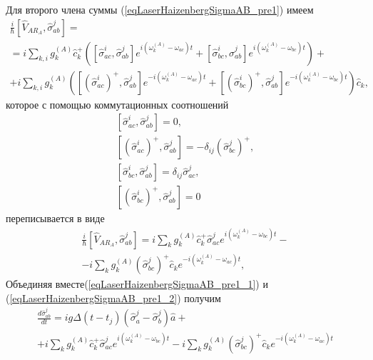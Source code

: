 Для второго члена суммы (\ref{eqLaserHaizenbergSigmaAB_pre1}) имеем
\begin{eqnarray}
\frac{i}{\hbar}
\left[\hat{V}_{AR_A}, \hat{\sigma}_{ab}^j\right] = 
\nonumber \\
=
i
\sum_{k,i}
g_k^{(A)}
\hat{c}_k^{+}
 \left(
\left[\hat{\sigma}^{i}_{ac},\hat{\sigma}_{ab}^j\right]  
e^{i\left(\omega_k^{(A)} - \omega_{ac}\right)t}
+ 
\left[\hat{\sigma}^{i}_{bc},\hat{\sigma}_{ab}^j\right]  
e^{i\left(\omega_k^{(A)} - \omega_{bc}\right)t}
\right)
+
\nonumber \\
+
 i
\sum_{k,i}
g_k^{(A)}
 \left(
\left[\left(\hat{\sigma}^{i}_{ac}\right)^{+},\hat{\sigma}_{ab}^j\right]  
e^{-i\left(\omega_k^{(A)} - \omega_{ac}\right)t}
+ 
\left[\left(\hat{\sigma}^{i}_{bc}\right)^{+},\hat{\sigma}_{ab}^j\right]  
e^{-i\left(\omega_k^{(A)} - \omega_{bc}\right)t}
\right)\hat{c}_k,
\nonumber
\end{eqnarray}
которое с помощью коммутационных соотношений
\begin{eqnarray}
\left[\hat{\sigma}^{i}_{ac},\hat{\sigma}_{ab}^j\right] = 0, 
\nonumber \\
\left[\left(\hat{\sigma}^{i}_{ac}\right)^{+},\hat{\sigma}_{ab}^j\right] = 
- \delta_{ij}\left(\hat{\sigma}^{j}_{bc}\right)^{+},
\nonumber \\
\left[\hat{\sigma}^{i}_{bc},\hat{\sigma}_{ab}^j\right] = \delta_{ij}\hat{\sigma}^{j}_{ac},
\nonumber \\
\left[\left(\hat{\sigma}^{i}_{bc}\right)^{+},\hat{\sigma}_{ab}^j\right] = 0
\label{eqLaserHaizenbergTaskKommutator2}
\end{eqnarray}
переписывается в виде
\begin{eqnarray}
\frac{i}{\hbar}
\left[\hat{V}_{AR_A}, \hat{\sigma}_{ab}^j\right] = 
i
\sum_{k}
g_k^{(A)}
\hat{c}_k^{+}
\hat{\sigma}^{j}_{ac}  
e^{i\left(\omega_k^{(A)} - \omega_{bc}\right)t} -
\nonumber \\
-
 i
\sum_{k}
g_k^{(A)}
\left(\hat{\sigma}^{j}_{bc}\right)^{+}\hat{c}_k
e^{-i\left(\omega_k^{(A)} - \omega_{ac}\right)t},
\label{eqLaserHaizenbergSigmaAB_pre1_2}
\end{eqnarray}
Объединяя вместе(\ref{eqLaserHaizenbergSigmaAB_pre1_1}) и 
(\ref{eqLaserHaizenbergSigmaAB_pre1_2}) получим 
\begin{eqnarray}
\frac{d \hat{\sigma}_{ab}^j}{d t} = 
i g 
\Delta\left(t - t_j\right) 
\left(\hat{\sigma}^{j}_{a} -
\hat{\sigma}^{j}_{b}\right)\hat{a} +
\nonumber \\
+ i \sum_{k}
g_k^{(A)}
\hat{c}_k^{+}
\hat{\sigma}^{j}_{ac}  
e^{i\left(\omega_k^{(A)} - \omega_{bc}\right)t}
-
 i
\sum_{k}
g_k^{(A)}
\left(\hat{\sigma}^{j}_{bc}\right)^{+}\hat{c}_k
e^{-i\left(\omega_k^{(A)} - \omega_{ac}\right)t}
\label{eqLaserHaizenbergSigmaAB_pre2}
\end{eqnarray}
